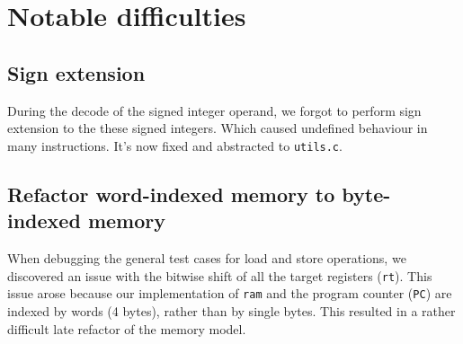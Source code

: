 \documentclass[11pt]{article}
\begin{document}
\section{Notable difficulties}

\subsection{Sign extension}
During the decode of the signed integer operand, we forgot to perform sign
extension to the these signed integers. Which caused undefined behaviour in
many instructions. It's now fixed and abstracted to \texttt{utils.c}.

\subsection{Refactor word-indexed memory to byte-indexed memory}
When debugging the general test cases for load and store operations, we
discovered an issue with the bitwise shift of all the target registers
(\texttt{rt}). This issue arose because our implementation of \texttt{ram} and
the program counter (\texttt{PC}) are indexed by words (4 bytes), rather than
by single bytes. This resulted in a rather difficult late refactor of the
memory model.
\end{document}
